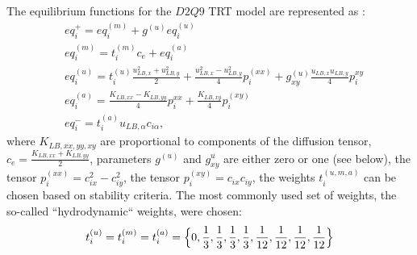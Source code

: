 \documentclass[review,12pt]{elsarticle}
\begin{document}
The equilibrium functions for the $D2Q9$ TRT model are represented as \cite{kuzmin-stability-optimal}:
\begin{equation}
\begin{aligned}
&eq_i^{+}=eq_i^{(m)}+g^{(u)} eq_i^{(u)}\\
&eq_i^{(m)}=t_i^{(m)} c_e+ eq_i^{(a)}\\
&eq_i^{(u)}=t_i^{(u)} \frac{u_{LB,x}^2+u_{LB,y}^2}{2}+\frac{u_{LB,x}^2-u_{LB,y}^2}{4} p_i^{(xx)}+g_{xy}^{(u)}\frac{u_{LB,x}
u_{LB,y}}{4} p_i^{xy}\\
&eq_i^{(a)}=\frac{K_{LB,xx}-K_{LB,yy}}{4} p_i^{xx}+\frac{K_{LB,xy}}{4} p_i^{(xy)}\\
&eq_i^{-}=t_i^{(a)}  u_{LB,\alpha} c_{i\alpha},
\end{aligned}
\end{equation}
where $K_{LB,xx,yy,xy}$ are proportional to components of the diffusion tensor,
$c_e=\frac{K_{LB,xx}+K_{LB,yy}}{2}$, parameters $g^{(u)}$ and $g^{u}_{xy}$ are either zero or one (see
below), the tensor $p_i^{(xx)}=c_{ix}^2-c_{iy}^2$, the tensor $p_i^{(xy)}=c_{ix} c_{iy}$, the
weights
$t_i^{(u,m,a)}$ can be chosen based on stability criteria. The most commonly used set of weights, the so-called
``hydrodynamic`` weights, were chosen:
\begin{equation}
t_i^{(u)}=t_i^{(m)}=t_i^{(a)}=\Bigl\{0,\frac{1}{3},\frac{1}{3},\frac{1}{3},\frac{1}{3},\frac{1}{12},
\frac {1}{12},\frac{1}{12},\frac{1}{12}\Bigr\}
\end{equation}
 
\end{document}
